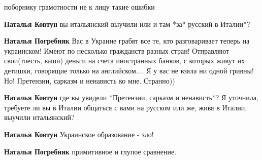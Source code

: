 \begin{itemize}
\begin{itemize}
поборнику грамотности не к лицу такие ошибки

 
\textbf{Наталья Ковтун} вы итальянский выучили или и там *за* русский в Италии*?

 
\textbf{Наталья Погребняк} Вас в Украине грабят все те, кто разговаривает теперь на украинском! Имеют по несколько гражданств разных стран! Отправляют свои(тоесть, ваши) деньги на счета иностранных банков, с которых живут их детишки, говорящие только на английском.... Я у вас не взяла ни одной гривны! Но! Претензии, сарказм и ненависть ко мне. Странно))

 
\textbf{Наталья Ковтун} где вы увидели *Претензии, сарказм и ненависть*? Я уточнила, требуете ли вы в Италии общаться с вами на русском или же, живя в Италии, выучили итальянский?

 
\textbf{Наталья Ковтун} Украинское образование - зло!

 
\textbf{Наталья Погребняк} примитивное и глупое сравнение.

 

\end{itemize}
\end{itemize}
